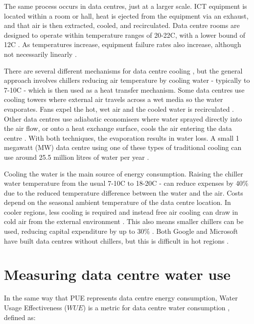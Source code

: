 \documentclass{article}
\begin{document}
The same process occurs in data centres, just at a larger scale. ICT equipment
is located within a room or hall, heat is ejected from the equipment via an
exhaust, and that air is then extracted, cooled, and recirculated. Data centre
rooms are designed to operate within temperature ranges of 20-22C, with a lower
bound of 12C \cite{miller_energy_2011}. As temperatures increase, equipment
failure rates also increase, although not necessarily linearly
\cite{miller_intel_2008}.

There are several different mechanisms for data centre cooling
\cite{ebrahimi_review_2014,capozzoli_cooling_2015}, but the general approach
involves chillers reducing air temperature by cooling water - typically to
7-10C \cite{frizziero_rethinking_2016} - which is then used as a heat transfer
mechanism. Some data centres use cooling towers where external air travels
across a wet media so the water evaporates. Fans expel the hot, wet air and the
cooled water is recirculated \cite{heslin_ignore_2016}. Other data centres use
adiabatic economisers where water sprayed directly into the air flow, or onto a
heat exchange surface, cools the air entering the data centre
\cite{frizziero_why_2018}. With both techniques, the evaporation results in
water loss. A small 1 megawatt (MW) data centre using one of these types of
traditional cooling can use around 25.5 million litres of water per year
\cite{heslin_ignore_2016}.

Cooling the water is the main source of energy consumption. Raising the chiller
water temperature from the usual 7-10C to 18-20C - can reduce expenses by 40\%
due to the reduced temperature difference between the water and the air. Costs
depend on the seasonal ambient temperature of the data centre location. In
cooler regions, less cooling is required and instead free air cooling can draw
in cold air from the external environment \cite{frizziero_rethinking_2016}.
This also means smaller chillers can be used, reducing capital expenditure by
up to 30\% \cite{frizziero_rethinking_2016}. Both Google
\cite{miller_googles_2009} and Microsoft \cite{miller_microsofts_2009} have
built data centres without chillers, but this is difficult in hot regions
\cite{david_experimental_2012}.

\section*{Measuring data centre water use}

In the same way that PUE represents data centre energy consumption, Water Usage
Effectiveness ($WUE$) is a metric for data centre water consumption
\cite{patterson_water_2011}, defined as:
\end{document}
